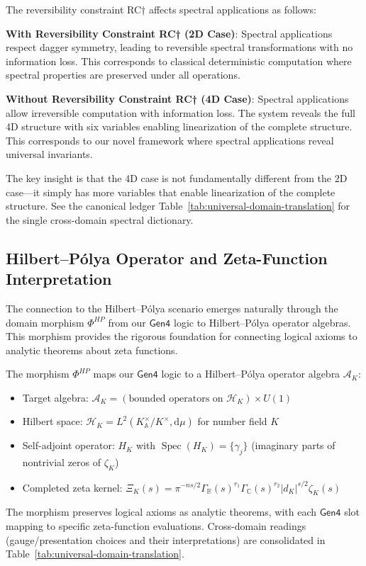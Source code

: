 \begin{definition}
\label{def:reversibility-constraint-spectral}
The reversibility constraint RC† affects spectral applications as follows:

\textbf{With Reversibility Constraint RC† (2D Case)}: Spectral applications respect dagger symmetry, leading to reversible spectral transformations with no information loss. This corresponds to classical deterministic computation where spectral properties are preserved under all operations.

\textbf{Without Reversibility Constraint RC† (4D Case)}: Spectral applications allow irreversible computation with information loss. The system reveals the full 4D structure with six variables enabling linearization of the complete structure. This corresponds to our novel framework where spectral applications reveal universal invariants.

The key insight is that the 4D case is not fundamentally different from the 2D case—it simply has more variables that enable linearization of the complete structure. See the canonical ledger Table~\ref{tab:universal-domain-translation} for the single cross-domain spectral dictionary.
\end{definition}

\subsection{Hilbert–Pólya Operator and Zeta-Function Interpretation}

The connection to the Hilbert–Pólya scenario emerges naturally through the domain morphism $\Phi^{HP}$ from our $\mathsf{Gen4}$ logic to Hilbert–Pólya operator algebras. This morphism provides the rigorous foundation for connecting logical axioms to analytic theorems about zeta functions.

\begin{definition}
\label{def:hilbert-polya-morphism}
The morphism $\Phi^{HP}$ maps our $\mathsf{Gen4}$ logic to a Hilbert–Pólya operator algebra $\mathcal{A}_K$:
\begin{itemize}
\item Target algebra: $\mathcal{A}_K = (\text{bounded operators on } \mathcal{H}_K) \times U(1)$
\item Hilbert space: $\mathcal{H}_K = L^2(K_{\mathbb{A}}^\times / K^\times, \mathrm{d}\mu)$ for number field $K$
\item Self-adjoint operator: $H_K$ with $\operatorname{Spec}(H_K) = \{\gamma_j\}$ (imaginary parts of nontrivial zeros of $\zeta_K$)
\item Completed zeta kernel: $\Xi_K(s) = \pi^{-ns/2} \Gamma_{\mathbb{R}}(s)^{r_1} \Gamma_{\mathbb{C}}(s)^{r_2} |d_K|^{s/2} \zeta_K(s)$
\end{itemize}
The morphism preserves logical axioms as analytic theorems, with each $\mathsf{Gen4}$ slot mapping to specific zeta-function evaluations. Cross-domain readings (gauge/presentation choices and their interpretations) are consolidated in Table~\ref{tab:universal-domain-translation}.
\end{definition}

